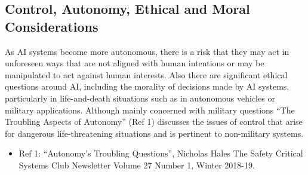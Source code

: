 \subsection{Control, Autonomy, Ethical and Moral Considerations}
As AI systems become more autonomous, there is a risk that they may act in unforeseen ways that are not aligned with human intentions or may be manipulated to act against human interests. Also there are significant ethical questions around AI, including the morality of decisions made by AI systems, particularly in life-and-death situations such as in autonomous vehicles or military applications. Although mainly concerned with military questions  “The Troubling Aspects of Autonomy” (Ref 1) discusses the issues of control that arise for dangerous life-threatening situations and is pertinent to non-military systems.
\begin{itemize}
\item Ref 1: “Autonomy’s Troubling Questions”, Nicholas Hales The Safety Critical Systems Club Newsletter Volume 27 Number 1, Winter 2018-19.
\end{itemize}


